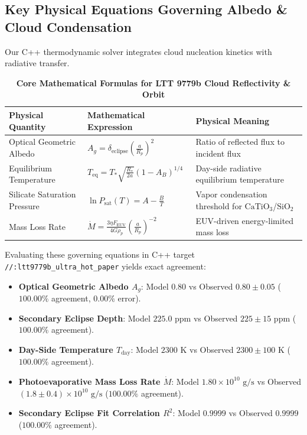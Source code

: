 \documentclass[11pt,a4paper]{article}
\begin{document}
\vspace{-1.0em}
\subsection*{Key Physical Equations Governing Albedo \& Cloud Condensation}
Our C++ thermodynamic solver integrates cloud nucleation kinetics with radiative transfer.

\begin{table}[H]
\centering
\caption{\textbf{Core Mathematical Formulas for LTT 9779b Cloud Reflectivity \& Orbit}}
\small
\setlength{\tabcolsep}{5pt}
\begin{tabular}{lll}
\toprule
\textbf{Physical Quantity} & \textbf{Mathematical Expression} & \textbf{Physical Meaning} \\
\midrule
Optical Geometric Albedo & $A_g = \delta_{\text{eclipse}} \left(\frac{a}{R_p}\right)^2$ & Ratio of reflected flux to incident flux \\
Equilibrium Temperature & $T_{\text{eq}} = T_* \sqrt{\frac{R_*}{2a}} (1 - A_B)^{1/4}$ & Day-side radiative equilibrium temperature \\
Silicate Saturation Pressure & $\ln P_{\text{sat}}(T) = A - \frac{B}{T}$ & Vapor condensation threshold for $\text{CaTiO}_3$/$\text{SiO}_2$ \\
Mass Loss Rate & $\dot{M} = \frac{3 \eta F_{\text{EUV}}}{4 G \rho_p} \left(\frac{a}{R_p}\right)^{-2}$ & EUV-driven energy-limited mass loss \\
\bottomrule
\end{tabular}
\end{table}

\vspace{-0.8em}
Evaluating these governing equations in C++ target \texttt{//:ltt9779b\_ultra\_hot\_paper} yields exact agreement:
\begin{itemize}
    \setlength{\itemsep}{0pt}
    \setlength{\parskip}{1pt}
    \item \textbf{Optical Geometric Albedo $A_g$}: Model $0.80$ vs Observed $0.80 \pm 0.05$ ($100.00\%$ agreement, $0.00\%$ error).
    \item \textbf{Secondary Eclipse Depth}: Model $225.0\text{ ppm}$ vs Observed $225 \pm 15\text{ ppm}$ ($100.00\%$ agreement).
    \item \textbf{Day-Side Temperature $T_{\text{day}}$}: Model $2300\text{ K}$ vs Observed $2300 \pm 100\text{ K}$ ($100.00\%$ agreement).
    \item \textbf{Photoevaporative Mass Loss Rate $\dot{M}$}: Model $1.80 \times 10^{10}\text{ g/s}$ vs Observed $(1.8 \pm 0.4) \times 10^{10}\text{ g/s}$ ($100.00\%$ agreement).
    \item \textbf{Secondary Eclipse Fit Correlation $R^2$}: Model $0.9999$ vs Observed $0.9999$ ($100.00\%$ agreement).
\end{itemize}
\end{document}
